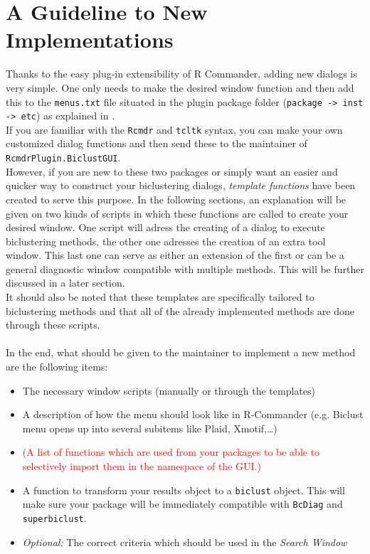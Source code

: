 \documentclass[a4paper]{article}\usepackage[]{graphicx}\usepackage[]{color}
\begin{document}
\section{A Guideline to New Implementations}
Thanks to the easy plug-in extensibility of R Commander, adding new dialogs is
very simple. One only needs to make the desired window function and then add
this to the \verb|menus.txt| file situated in the plugin package folder
(\verb|package -> inst -> etc|) as explained in \citet{Fox2007}.\\
If you are familiar with the \verb|Rcmdr| and \verb|tcltk| syntax, you can make
your own customized dialog functions and then send these to the maintainer of
\verb|RcmdrPlugin.BiclustGUI|. \\
However, if you are new to these two packages or simply want an easier and
quicker way to construct your biclustering dialogs, {\it template functions} have been
created to serve this purpose. In the following sections, an explanation will be
given on two kinds of scripts in which these functions are called to create your
desired window. One script will adress the creating of a dialog to execute
biclustering methods, the other one adresses the creation of an extra tool
window. This last one can serve as either an extension of the first or can be a
general diagnostic window compatible with multiple methods. This will be
further discussed in a later section.\\
It should also be noted that these templates are specifically tailored to
biclustering methods and that all of the already implemented methods are done
through these scripts.
\\ \\
In the end, what should be given to the maintainer to implement a new method are
the following items:
\begin{itemize}
  \item The necessary window scripts (manually or through the templates)
  \item A description of how the menu should look like in R-Commander (e.g. Biclust menu opens up into several subitems like Plaid, Xmotif,\dots)
  \item \textcolor{red}{(A list of functions which are used from your packages to
  be able to selectively import them in the namespace of the GUI.)}
  \item A function to transform your results object to a \verb|biclust| object.
  This will make sure your package will be immediately compatible with
  \verb|BcDiag| and \verb|superbiclust|.
  \item {\it Optional:} The correct criteria which should be used in the {\it Search Window}
\end{itemize}
 
\end{document}
